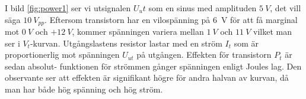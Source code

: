 I bild \ref{fig:power1} ser vi utsignalen \(U_ut\) som en sinus med amplituden
\(5\ V\), det vill säga \(10\ V_{pp}\). Eftersom transistorn har en vilospänning på 6~V
för att få marginal mot \(0\ V\) och \(+12\ V\), kommer spänningen variera
mellan \(1\ V\) och \(11\ V\) vilket man ser i \(V_t\)-kurvan. Utgångslastens
resistor lastar med en ström \(I_t\) som är proportionerlig mot spänningen
\(U_{ut}\) på utgången. Effekten för transistorn \(P_t\) är sedan absolut-
funktionen för strömmen gånger spänningen enligt Joules lag. Den observante ser
att effekten är signifikant högre för andra halvan av kurvan, då man har både
hög spänning och hög ström.
